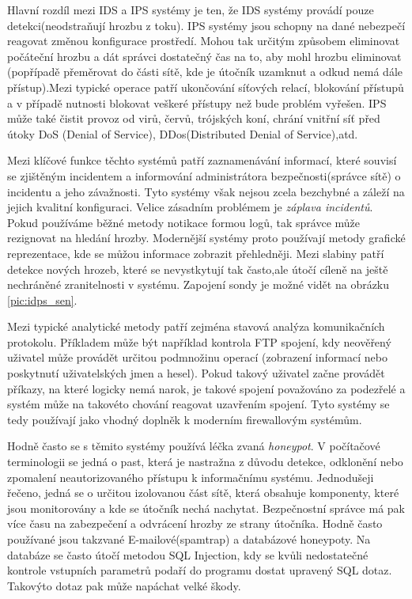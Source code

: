 \documentclass[11pt,twoside,a4paper]{article}
\begin{document}
Hlavní rozdíl mezi IDS a IPS systémy je ten, že IDS systémy provádí pouze detekci(neodstraňují hrozbu z toku). IPS systémy jsou schopny na dané nebezpečí reagovat změnou konfigurace prostředí. Mohou tak určitým způsobem eliminovat počáteční hrozbu a dát správci dostatečný čas na to, aby mohl hrozbu eliminovat (popřípadě přeměrovat do části sítě, kde je útočník uzamknut a odkud nemá dále přístup).Mezi typické operace patří ukončování síťových relací, blokování přístupů a v případě nutnosti blokovat veškeré přístupy než bude problém vyřešen. IPS může také čistit provoz od virů, červů, trójských koní, chrání vnitřní síť před útoky DoS (Denial of Service), DDos(Distributed Denial of Service),atd.

Mezi klíčové funkce těchto systémů patří zaznamenávání informací, které souvisí se zjištěným incidentem a informování administrátora bezpečnosti(správce sítě) o incidentu a jeho závažnosti. Tyto systémy však nejsou zcela bezchybné a záleží na jejich kvalitní konfiguraci. Velice zásadním problémem je \textit{záplava incidentů}. Pokud používáme běžné metody notikace formou logů, tak správce může rezignovat na hledání hrozby. Modernější systémy proto používají metody grafické reprezentace, kde se můžou informace zobrazit přehledněji. Mezi slabiny patří detekce nových hrozeb, které se nevystkytují tak často,ale útočí cíleně na ještě nechráněné zranitelnosti v systému. Zapojení sondy je možné vidět na obrázku \ref{pic:idps_sen}.

Mezi typické analytické metody patří zejména stavová analýza komunikačních protokolu. Příkladem může být například kontrola FTP spojení, kdy neověřený uživatel může provádět určitou podmnožinu operací (zobrazení informací nebo poskytnutí uživatelských jmen a hesel). Pokud takový uživatel začne provádět příkazy, na které logicky nemá narok, je takové spojení považováno za podezřelé a systém může na takovéto chování reagovat uzavřením spojení. Tyto systémy se tedy používají jako vhodný doplněk k moderním firewallovým systémům.

Hodně často se s těmito systémy používá léčka zvaná \textit{honeypot}. V počítačové terminologii se jedná o past, která je nastražna z důvodu detekce, odklonění nebo zpomalení neautorizovaného přístupu k informačnímu systému. Jednodušeji řečeno, jedná se o určitou izolovanou část sítě, která obsahuje komponenty, které jsou monitorovány a kde se útočník nechá nachytat. Bezpečnostní správce má pak více času na zabezpečení a odvrácení hrozby ze strany útočníka. Hodně často používané jsou takzvané E-mailové(spamtrap) a databázové honeypoty. Na databáze se často útočí metodou SQL Injection, kdy se kvůli nedostatečné kontrole vstupních parametrů podaří do programu dostat upravený SQL dotaz. Takovýto dotaz pak může napáchat velké škody. 
\end{document}
